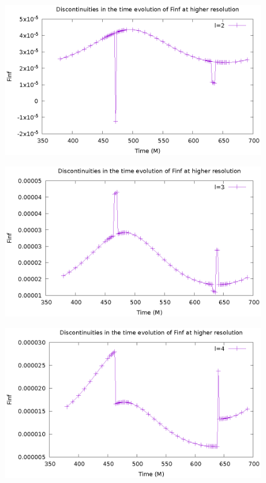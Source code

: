 \documentclass{article}
\begin{document}
\begin{figure}
  \includegraphics{FinfTimel2}
\end{figure}
\begin{figure}
  \includegraphics{FinfTimel3}
\end{figure}
\begin{figure}
  \includegraphics{FinfTimel4}
\end{figure}
\end{document}
